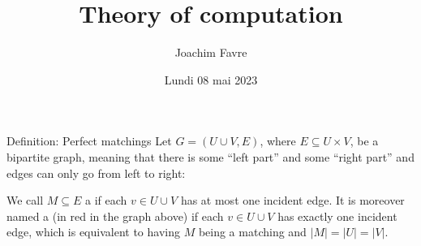 \documentclass[a4paper]{article}
\title{Theory of computation}
\author{Joachim Favre}
\date{Lundi 08 mai 2023}
\begin{document}
\maketitle


\begin{parag}{Definition: Perfect matchings}
    Let $G = \left(U \cup V, E\right)$, where $E \subseteq U \times V$, be a bipartite graph, meaning that there is some ``left part'' and some ``right part'' and edges can only go from left to right:

    We call $M \subseteq E$ a  if each $v \in U \cup V$ has at most one incident edge. It is moreover named a  (in red in the graph above) if each $v \in U \cup V$ has exactly one incident edge, which is equivalent to having $M$ being a matching and $\left|M\right| = \left|U\right| = \left|V\right|$.
\end{parag}
\end{document}
